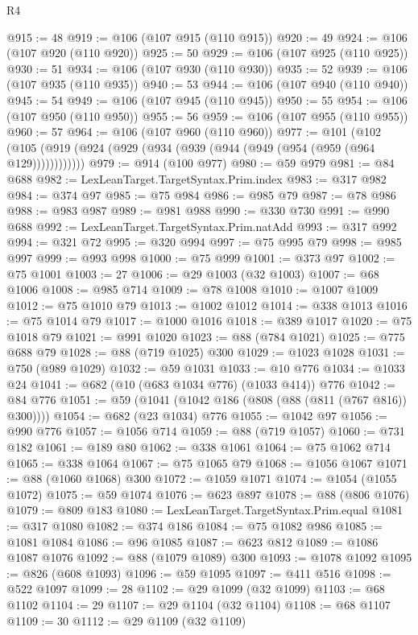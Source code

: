 \begin{lexlean}{R4}
\begin{coremodule}
@915 := 48
@919 := @106 (@107 @915 (@110 @915))
@920 := 49
@924 := @106 (@107 @920 (@110 @920))
@925 := 50
@929 := @106 (@107 @925 (@110 @925))
@930 := 51
@934 := @106 (@107 @930 (@110 @930))
@935 := 52
@939 := @106 (@107 @935 (@110 @935))
@940 := 53
@944 := @106 (@107 @940 (@110 @940))
@945 := 54
@949 := @106 (@107 @945 (@110 @945))
@950 := 55
@954 := @106 (@107 @950 (@110 @950))
@955 := 56
@959 := @106 (@107 @955 (@110 @955))
@960 := 57
@964 := @106 (@107 @960 (@110 @960))
@977 := @101
    (@102 (@105 (@919 (@924 (@929 (@934 (@939 (@944 (@949 (@954 (@959 (@964 @129))))))))))))
@979 := @914 (@100 @977)
@980 := @59 @979
@981 := @84 @688
@982 := LexLeanTarget.TargetSyntax.Prim.index
@983 := @317 @982
@984 := @374 @97
@985 := @75 @984
@986 := @985 @79
@987 := @78 @986
@988 := @983 @987
@989 := @981 @988
@990 := @330 @730
@991 := @990 @688
@992 := LexLeanTarget.TargetSyntax.Prim.natAdd
@993 := @317 @992
@994 := @321 @72
@995 := @320 @994
@997 := @75 @995 @79
@998 := @985 @997
@999 := @993 @998
@1000 := @75 @999
@1001 := @373 @97
@1002 := @75 @1001
@1003 := 27
@1006 := @29 @1003 (@32 @1003)
@1007 := @68 @1006
@1008 := @985 @714
@1009 := @78 @1008
@1010 := @1007 @1009
@1012 := @75 @1010 @79
@1013 := @1002 @1012
@1014 := @338 @1013
@1016 := @75 @1014 @79
@1017 := @1000 @1016
@1018 := @389 @1017
@1020 := @75 @1018 @79
@1021 := @991 @1020
@1023 := @88 (@784 @1021)
@1025 := @775 @688 @79
@1028 := @88 (@719 @1025) @300
@1029 := @1023 @1028
@1031 := @750 (@989 @1029)
@1032 := @59 @1031
@1033 := @10 @776
@1034 := @1033 @24
@1041 := @682 (@10 (@683 @1034 @776) (@1033 @414)) @776
@1042 := @84 @776
@1051 := @59 (@1041 (@1042 @186 (@808 (@88 (@811 (@767 @816)) @300))))
@1054 := @682 (@23 @1034) @776
@1055 := @1042 @97
@1056 := @990 @776
@1057 := @1056 @714
@1059 := @88 (@719 @1057)
@1060 := @731 @182
@1061 := @189 @80
@1062 := @338 @1061
@1064 := @75 @1062 @714
@1065 := @338 @1064
@1067 := @75 @1065 @79
@1068 := @1056 @1067
@1071 := @88 (@1060 @1068) @300
@1072 := @1059 @1071
@1074 := @1054 (@1055 @1072)
@1075 := @59 @1074
@1076 := @623 @897
@1078 := @88 (@806 @1076)
@1079 := @809 @183
@1080 := LexLeanTarget.TargetSyntax.Prim.equal
@1081 := @317 @1080
@1082 := @374 @186
@1084 := @75 @1082 @986
@1085 := @1081 @1084
@1086 := @96 @1085
@1087 := @623 @812
@1089 := @1086 @1087 @1076
@1092 := @88 (@1079 @1089) @300
@1093 := @1078 @1092
@1095 := @826 (@608 @1093)
@1096 := @59 @1095
@1097 := @411 @516
@1098 := @522 @1097
@1099 := 28
@1102 := @29 @1099 (@32 @1099)
@1103 := @68 @1102
@1104 := 29
@1107 := @29 @1104 (@32 @1104)
@1108 := @68 @1107
@1109 := 30
@1112 := @29 @1109 (@32 @1109)

\end{coremodule}
\end{lexlean}

